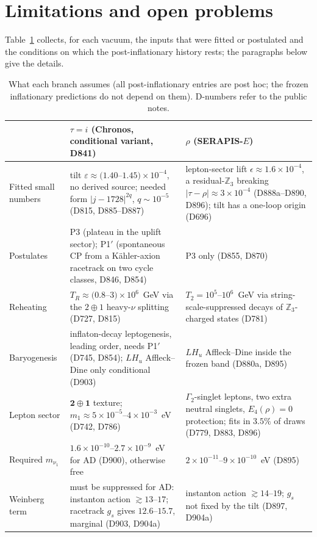 \documentclass[aps,prd,twocolumn,superscriptaddress,nofootinbib,floatfix]{revtex4-2}
\begin{document}
\section{Limitations and open problems}\label{sec:limits}
Table~\ref{tab:conditions} collects, for each vacuum, the inputs that were fitted or postulated and the conditions on which the post-inflationary history rests; the paragraphs below give the details.
\begin{table}[tbp]
\caption{What each branch assumes (all post-inflationary entries are post hoc; the frozen inflationary predictions do not depend on them). D-numbers refer to the public notes.}\label{tab:conditions}
\footnotesize
\begin{ruledtabular}
\begin{tabular}{p{}p{}p{}}
 & $\tau=i$ (Chronos, conditional variant, D841) & $\rho$ (SERAPIS-$E$) \\ \hline
Fitted small numbers & tilt $\varepsilon\approx(1.40$--$1.45)\times10^{-4}$, no derived source; needed form $|j-1728|^{2q}$, $q\sim10^{-5}$ (D815, D885--D887) & lepton-sector lift $\epsilon\approx1.6\times10^{-4}$, a residual-$\mathbb{Z}_3$ breaking $|\tau-\rho|\approx3\times10^{-4}$ (D888a--D890, D896); tilt has a one-loop origin (D696) \\
Postulates & P3 (plateau in the uplift sector); P1$'$ (spontaneous CP from a K\"ahler-axion racetrack on two cycle classes, D846, D854) & P3 only (D855, D870) \\
Reheating & $T_R\approx(0.8$--$3)\times10^6$~GeV via the $2\oplus1$ heavy-$\nu$ splitting (D727, D815) & $T_2=10^5$--$10^6$~GeV via string-scale-suppressed decays of $\mathbb{Z}_3$-charged states (D781) \\
Baryogenesis & inflaton-decay leptogenesis, leading order, needs P1$'$ (D745, D854); $LH_u$ Affleck--Dine only conditional (D903) & $LH_u$ Affleck--Dine inside the frozen band (D880a, D895) \\
Lepton sector & $\mathbf2\oplus\mathbf1$ texture; $m_1\approx5\times10^{-5}$--$4\times10^{-3}$~eV (D742, D786) & $\Gamma_2$-singlet leptons, two extra neutral singlets, $E_4(\rho)=0$ protection; fits in $3.5\%$ of draws (D779, D883, D896) \\
Required $m_{\nu_1}$ & $1.6\times10^{-10}$--$2.7\times10^{-9}$~eV for AD (D900), otherwise free & $2\times10^{-11}$--$9\times10^{-10}$~eV (D895) \\
Weinberg term & must be suppressed for AD: instanton action $\gtrsim13$--$17$; racetrack $g_s$ gives $12.6$--$15.7$, marginal (D903, D904a) & instanton action $\gtrsim14$--$19$; $g_s$ not fixed by the tilt (D897, D904a) \\
\end{tabular}
\end{ruledtabular}
\end{table}
\end{document}

